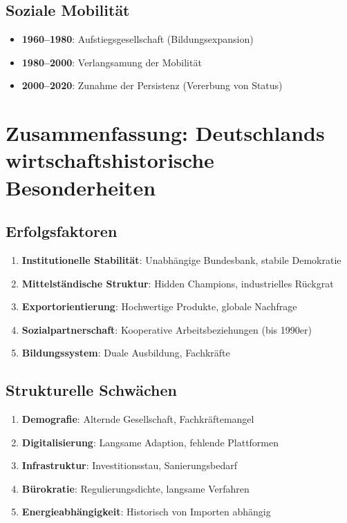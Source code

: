 \subsection{Soziale Mobilität}
\begin{itemize}
\item \textbf{1960--1980}: Aufstiegsgesellschaft (Bildungsexpansion)
\item \textbf{1980--2000}: Verlangsamung der Mobilität
\item \textbf{2000--2020}: Zunahme der Persistenz (Vererbung von Status)
\end{itemize}

\section{Zusammenfassung: Deutschlands wirtschaftshistorische Besonderheiten}

\subsection{Erfolgsfaktoren}
\begin{enumerate}
\item \textbf{Institutionelle Stabilität}: Unabhängige Bundesbank, stabile Demokratie
\item \textbf{Mittelständische Struktur}: Hidden Champions, industrielles Rückgrat
\item \textbf{Exportorientierung}: Hochwertige Produkte, globale Nachfrage
\item \textbf{Sozialpartnerschaft}: Kooperative Arbeitsbeziehungen (bis 1990er)
\item \textbf{Bildungssystem}: Duale Ausbildung, Fachkräfte
\end{enumerate}

\subsection{Strukturelle Schwächen}
\begin{enumerate}
\item \textbf{Demografie}: Alternde Gesellschaft, Fachkräftemangel
\item \textbf{Digitalisierung}: Langsame Adaption, fehlende Plattformen
\item \textbf{Infrastruktur}: Investitionsstau, Sanierungsbedarf
\item \textbf{Bürokratie}: Regulierungsdichte, langsame Verfahren
\item \textbf{Energieabhängigkeit}: Historisch von Importen abhängig
\end{enumerate}

